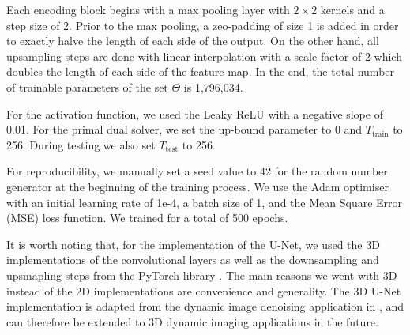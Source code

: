 \documentclass[12pt]{article}
\begin{document}
Each encoding block begins with a max pooling layer with $2 \times 2$ kernels and a step size of 2.
Prior to the max pooling, a zeo-padding of size 1 is added in order to exactly halve the length of each side of the output.
On the other hand, all upsampling steps are done with linear interpolation with a scale factor of 2 which doubles the length of each side of the feature map.
In the end, the total number of trainable parameters of the set $\Theta$ is 1,796,034.

For the activation function, we used the Leaky ReLU with a negative slope of 0.01.
For the primal dual solver, we set the up-bound parameter to 0 and $T_{\text{train}}$ to 256.
During testing we also set $T_{\text{test}}$ to 256.

For reproducibility, we manually set a seed value to 42 for the random number generator at the beginning of the training process. We use the Adam optimiser with an initial learning rate of 1e-4, a batch size of 1, and the Mean Square Error (MSE) loss function. We trained for a total of 500 epochs.

It is worth noting that, for the implementation of the U-Net, 
we used the 3D implementations of the convolutional layers as well as the downsampling and upsmapling steps from the PyTorch library \cite{NEURIPS2019_9015}.
The main reasons we went with 3D instead of the 2D implementations are convenience and generality.
The 3D U-Net implementation is adapted from the dynamic image denoising application in \cite{kofler2023learning}, and can therefore be extended to 3D dynamic imaging applications in the future.



    





\end{document}

